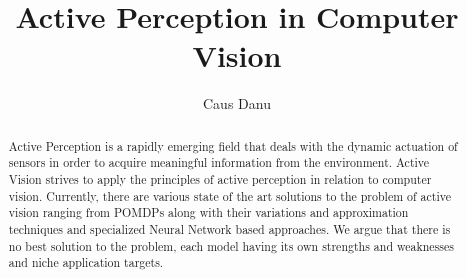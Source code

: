 \documentclass[a4paper,11pt,english]{article}
\begin{document}
\title{Active Perception in Computer Vision}
\author{Caus Danu}
	
\maketitle 
\begin{abstract}
	Active Perception is a rapidly emerging field that deals with the dynamic actuation of sensors in order to acquire meaningful information from the environment. Active Vision strives to apply the principles of active perception in relation to computer vision. Currently, there are various state of the art solutions to the problem of active vision ranging from POMDPs along with their variations and approximation techniques and specialized Neural Network based approaches. We argue that there is no best solution to the problem, each model having its own strengths and weaknesses and niche application targets.
\end{abstract}
\end{document}

